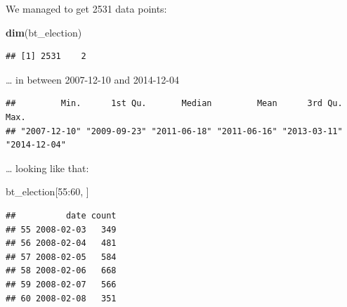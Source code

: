 \documentclass[]{article}
\newenvironment{Shaded}{\begin{snugshade}}{\end{snugshade}}
\newcommand{\KeywordTok}[1]{\textcolor[rgb]{0.13,0.29,0.53}{\textbf{{#1}}}}
\newcommand{\DataTypeTok}[1]{\textcolor[rgb]{0.13,0.29,0.53}{{#1}}}
\newcommand{\DecValTok}[1]{\textcolor[rgb]{0.00,0.00,0.81}{{#1}}}
\newcommand{\StringTok}[1]{\textcolor[rgb]{0.31,0.60,0.02}{{#1}}}
\newcommand{\NormalTok}[1]{{#1}}
\begin{document}
\begin{Shaded}
\end{Shaded}

We managed to get 2531 data points:

\begin{Shaded}
\begin{Highlighting}[]
\KeywordTok{dim}\NormalTok{(bt_election)}
\end{Highlighting}
\end{Shaded}

\begin{verbatim}
## [1] 2531    2
\end{verbatim}

\ldots{} in between 2007-12-10 and 2014-12-04

\begin{Shaded}
\end{Shaded}

\begin{verbatim}
##         Min.      1st Qu.       Median         Mean      3rd Qu.         Max. 
## "2007-12-10" "2009-09-23" "2011-06-18" "2011-06-16" "2013-03-11" "2014-12-04"
\end{verbatim}

\ldots{} looking like that:

\begin{Shaded}
\begin{Highlighting}[]
\NormalTok{bt_election[}\DecValTok{55}\NormalTok{:}\DecValTok{60}\NormalTok{, ]}
\end{Highlighting}
\end{Shaded}

\begin{verbatim}
##          date count
## 55 2008-02-03   349
## 56 2008-02-04   481
## 57 2008-02-05   584
## 58 2008-02-06   668
## 59 2008-02-07   566
## 60 2008-02-08   351
\end{verbatim}
\end{document}
